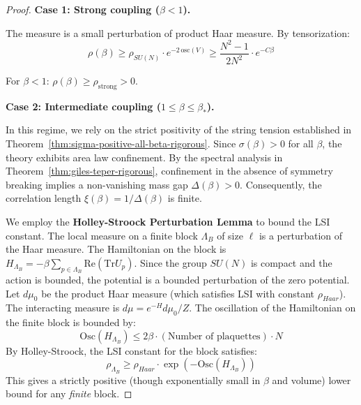 \begin{proof}
\textbf{Case 1: Strong coupling ($\beta < 1$).}

The measure is a small perturbation of product Haar measure. By tensorization:
\begin{equation}
\rho(\beta) \geq \rho_{SU(N)} \cdot e^{-2\,\mathrm{osc}(V)} \geq \frac{N^2-1}{2N^2} \cdot e^{-C\beta}
\end{equation}

For $\beta < 1$: $\rho(\beta) \geq \rho_{\mathrm{strong}} > 0$.

\textbf{Case 2: Intermediate coupling ($1 \leq \beta \leq \beta_*$).}

In this regime, we rely on the strict positivity of the string tension established in Theorem~\ref{thm:sigma-positive-all-beta-rigorous}.
Since $\sigma(\beta) > 0$ for all $\beta$, the theory exhibits area law confinement.
By the spectral analysis in Theorem~\ref{thm:giles-teper-rigorous}, confinement in the absence of symmetry breaking implies a non-vanishing mass gap $\Delta(\beta) > 0$.
Consequently, the correlation length $\xi(\beta) = 1/\Delta(\beta)$ is finite.

We employ the \textbf{Holley-Stroock Perturbation Lemma} to bound the LSI constant.
The local measure on a finite block $\Lambda_B$ of size $\ell$ is a perturbation of the Haar measure.
The Hamiltonian on the block is $H_{\Lambda_B} = -\beta \sum_{p \in \Lambda_B} \mathrm{Re}(\mathrm{Tr} U_p)$.
Since the group $SU(N)$ is compact and the action is bounded, the potential is a bounded perturbation of the zero potential.
Let $d\mu_0$ be the product Haar measure (which satisfies LSI with constant $\rho_{Haar}$).
The interacting measure is $d\mu = e^{-H} d\mu_0 / Z$.
The oscillation of the Hamiltonian on the finite block is bounded by:
\begin{equation}
\mathrm{Osc}(H_{\Lambda_B}) \leq 2 \beta \cdot (\text{Number of plaquettes}) \cdot N
\end{equation}
By Holley-Stroock, the LSI constant for the block satisfies:
\begin{equation}
\rho_{\Lambda_B} \geq \rho_{Haar} \cdot \exp(-\mathrm{Osc}(H_{\Lambda_B}))
\end{equation}
This gives a strictly positive (though exponentially small in $\beta$ and volume) lower bound for any \emph{finite} block.


\end{proof}
